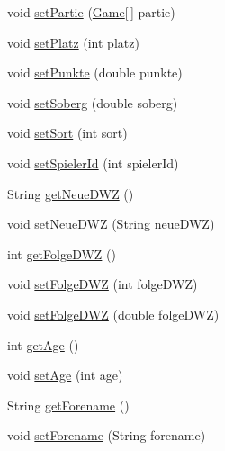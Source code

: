 \begin{DoxyCompactItemize}
\item 
void \hyperlink{classde_1_1turnierverwaltung_1_1model_1_1_player_a1de06a5849b111c4e3d9f38315b1d7cc}{set\+Partie} (\hyperlink{classde_1_1turnierverwaltung_1_1model_1_1_game}{Game}\mbox{[}$\,$\mbox{]} partie)
\item 
void \hyperlink{classde_1_1turnierverwaltung_1_1model_1_1_player_a66e2b67fba517406c97f8317b3361bb2}{set\+Platz} (int platz)
\item 
void \hyperlink{classde_1_1turnierverwaltung_1_1model_1_1_player_a5eb4161e43458888fd469d65433c74c2}{set\+Punkte} (double punkte)
\item 
void \hyperlink{classde_1_1turnierverwaltung_1_1model_1_1_player_ad6dc18490ac41b54f69a60bb07f56f2a}{set\+Soberg} (double soberg)
\item 
void \hyperlink{classde_1_1turnierverwaltung_1_1model_1_1_player_ac0e187980d7b83ad0257abf9d8fb9309}{set\+Sort} (int sort)
\item 
void \hyperlink{classde_1_1turnierverwaltung_1_1model_1_1_player_a32999db8d54b6be3ccc9a186d93034bb}{set\+Spieler\+Id} (int spieler\+Id)
\item 
String \hyperlink{classde_1_1turnierverwaltung_1_1model_1_1_player_a5db9496578d6bf7661cba0c4221ee317}{get\+Neue\+D\+WZ} ()
\item 
void \hyperlink{classde_1_1turnierverwaltung_1_1model_1_1_player_aea3d0f16cafc93f2c6f958181264cc24}{set\+Neue\+D\+WZ} (String neue\+D\+WZ)
\item 
int \hyperlink{classde_1_1turnierverwaltung_1_1model_1_1_player_a66d0ef31080b3d1513c6e44657123d0a}{get\+Folge\+D\+WZ} ()
\item 
void \hyperlink{classde_1_1turnierverwaltung_1_1model_1_1_player_a66c1e59060350e3b83c75c61d33789f4}{set\+Folge\+D\+WZ} (int folge\+D\+WZ)
\item 
void \hyperlink{classde_1_1turnierverwaltung_1_1model_1_1_player_ae40f6b7499f29da2e63b516841b4a494}{set\+Folge\+D\+WZ} (double folge\+D\+WZ)
\item 
int \hyperlink{classde_1_1turnierverwaltung_1_1model_1_1_player_ae970a93460939972d94e15fdd0621d77}{get\+Age} ()
\item 
void \hyperlink{classde_1_1turnierverwaltung_1_1model_1_1_player_abb92db42a13858bc9f43746ababbf6f8}{set\+Age} (int age)
\item 
String \hyperlink{classde_1_1turnierverwaltung_1_1model_1_1_player_ac65ca9a09e0ce3b0bc803ca07a70c706}{get\+Forename} ()
\item 
void \hyperlink{classde_1_1turnierverwaltung_1_1model_1_1_player_ab8e94cdbdc9896964a9297ab6e71345a}{set\+Forename} (String forename)

\end{DoxyCompactItemize}
